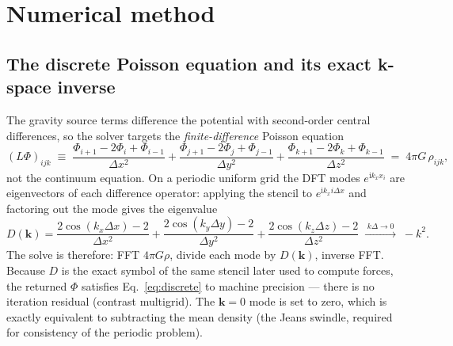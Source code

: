 \documentclass[11pt]{article}
\begin{document}
\section{Numerical method}

\subsection{The discrete Poisson equation and its exact k-space inverse}
The gravity source terms difference the potential with second-order central
differences, so the solver targets the \emph{finite-difference} Poisson equation
\begin{equation}
  (L\Phi)_{ijk} \;\equiv\;
  \frac{\Phi_{i+1}-2\Phi_i+\Phi_{i-1}}{\Delta x^2} +
  \frac{\Phi_{j+1}-2\Phi_j+\Phi_{j-1}}{\Delta y^2} +
  \frac{\Phi_{k+1}-2\Phi_k+\Phi_{k-1}}{\Delta z^2}
  \;=\; 4\pi G\,\rho_{ijk},
  \label{eq:discrete}
\end{equation}
not the continuum equation. On a periodic uniform grid the DFT modes
$e^{\mathrm{i}k_x x_i}$ are eigenvectors of each difference operator: applying the
stencil to $e^{\mathrm{i}k_x i\Delta x}$ and factoring out the mode gives the
eigenvalue
\begin{equation}
  D(\mathbf{k}) = \frac{2\cos(k_x\Delta x)-2}{\Delta x^2}
                + \frac{2\cos(k_y\Delta y)-2}{\Delta y^2}
                + \frac{2\cos(k_z\Delta z)-2}{\Delta z^2}
  \;\xrightarrow{\;k\Delta\to0\;}\; -k^2 .
  \label{eq:Dk}
\end{equation}
The solve is therefore: FFT $4\pi G\rho$, divide each mode by $D(\mathbf{k})$,
inverse FFT. Because $D$ is the exact symbol of the same stencil later used to
compute forces, the returned $\Phi$ satisfies Eq.~\eqref{eq:discrete} to machine
precision --- there is no iteration residual (contrast multigrid). The
$\mathbf{k}=0$ mode is set to zero, which is exactly equivalent to subtracting the
mean density (the Jeans swindle, required for consistency of the periodic problem).
\end{document}
